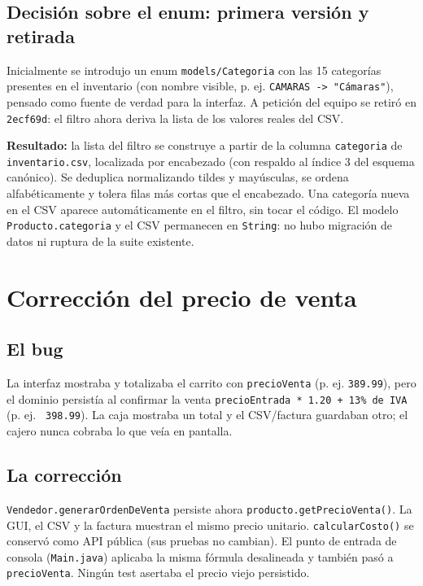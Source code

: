 \subsection{Decisión sobre el enum: primera versión y retirada}
Inicialmente se introdujo un enum \texttt{models/Categoria} con las 15 categorías presentes en el inventario (con nombre visible, p. ej. \texttt{CAMARAS -> "Cámaras"}), pensado como fuente de verdad para la interfaz. A petición del equipo se retiró en \texttt{2ecf69d}: el filtro ahora deriva la lista de los valores reales del CSV.

\begin{techbox}
\textbf{Resultado:} la lista del filtro se construye a partir de la columna \texttt{categoria} de \texttt{inventario.csv}, localizada por encabezado (con respaldo al índice 3 del esquema canónico). Se deduplica normalizando tildes y mayúsculas, se ordena alfabéticamente y tolera filas más cortas que el encabezado. Una categoría nueva en el CSV aparece automáticamente en el filtro, sin tocar el código. El modelo \texttt{Producto.categoria} y el CSV permanecen en \texttt{String}: no hubo migración de datos ni ruptura de la suite existente.
\end{techbox}

\section{Corrección del precio de venta}
\subsection{El bug}
La interfaz mostraba y totalizaba el carrito con \texttt{precioVenta} (p. ej. \texttt{389.99}), pero el dominio persistía al confirmar la venta \texttt{precioEntrada * 1.20 + 13\% de IVA} (p. ej. \texttt{~398.99}). La caja mostraba un total y el CSV/factura guardaban otro; el cajero nunca cobraba lo que veía en pantalla.

\subsection{La corrección}
\texttt{Vendedor.generarOrdenDeVenta} persiste ahora \texttt{producto.getPrecioVenta()}. La GUI, el CSV y la factura muestran el mismo precio unitario. \texttt{calcularCosto()} se conservó como API pública (sus pruebas no cambian). El punto de entrada de consola (\texttt{Main.java}) aplicaba la misma fórmula desalineada y también pasó a \texttt{precioVenta}. Ningún test asertaba el precio viejo persistido.
